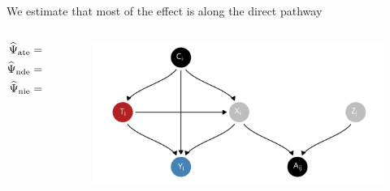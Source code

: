 \documentclass[aspectratio=169]{beamer}
\theoremstyle{remark}
\begin{document}
\begin{frame}{We estimate that most of the effect is along the direct pathway}

    \begin{columns}
        \begin{column}{0.35\textwidth}
            \begin{align*}
                \widehat{\Psi}_\mathrm{ate} & = -2.7 \pm 1.3 \\
                \widehat{\Psi}_\mathrm{nde} & = -1.8 \pm 1.1 \\
                \widehat{\Psi}_\mathrm{nie} & = -1 \pm 0.7
            \end{align*}

        \end{column}
        \begin{column}{0.65\textwidth}
            \centering
            \begin{figure}[ht]
                \includegraphics[width=\textwidth]{figures/dags/bipartite-mediation.png}
            \end{figure}
        \end{column}
    \end{columns}
\end{frame}
\end{document}

